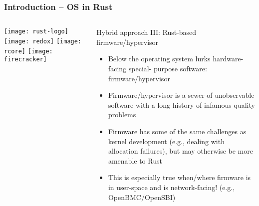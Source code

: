 \begin{frame}[plain]
	\frametitle{Introduction -- OS in Rust}
	
	
	
	\begin{columns}
		
		\begin{column}{.2\textwidth}
			
			\texttt{[image: rust-logo]}
			\texttt{[image: redox]}
			\texttt{[image: rcore]}
			\texttt{[image: firecracker]}
		\end{column}
		
		\begin{column}{.8\textwidth}
			
			Hybrid approach III: Rust-based firmware/hypervisor

			\begin{itemize}
				
				\item  Below the operating system lurks hardware-facing special-
				purpose software: firmware/hypervisor
				
				
				\item Firmware/hypervisor is a sewer of unobservable software with a long
				history of infamous quality problems
				
				
				\item  Firmware has some of the same challenges as kernel
				development (e.g., dealing with allocation failures), but may
				otherwise be more amenable to Rust

				\item This is especially true when/where firmware is in user-space
				and is network-facing! (e.g., OpenBMC/OpenSBI)
				
			\end{itemize}
			
		\end{column}
		
		
	\end{columns}
	
	
\end{frame}
